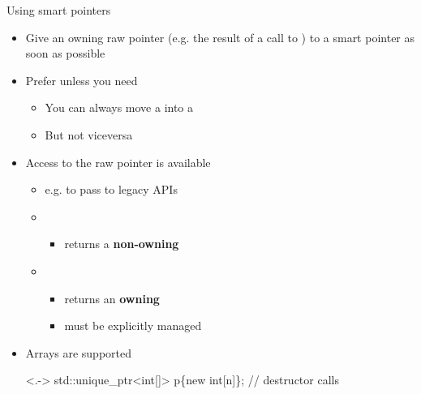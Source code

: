 \begin{frame}[fragile]{Using smart pointers}

    \begin{itemize}[<+->]

    \item Give an owning raw pointer (e.g. the result of a call to )
      to a smart pointer as soon as possible
    \item Prefer  unless you need 
      \begin{itemize}[<.->]
      \item You can always move a  into a 
      \item But not viceversa
      \end{itemize}

    \item Access to the raw pointer is available
      \begin{itemize}[<.->]
      \item e.g. to pass to legacy APIs
      \item {}
        \begin{itemize}
        \item returns a \textbf{non-owning} 
        \end{itemize}
      \item {}
        \begin{itemize}
        \item returns an \textbf{owning} 
        \item must be explicitly managed
        \end{itemize}
      \end{itemize}

    \item Arrays are supported

      \begin{codeblock}<.->
std::unique_ptr<int[]> p\{new int[n]\}; // destructor calls \end{codeblock}

    \end{itemize}

\end{frame}

